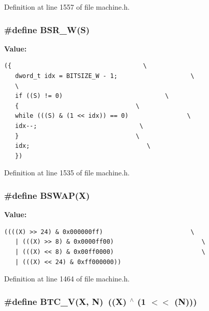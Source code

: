 Definition at line 1557 of file machine.h.
\subsubsection[{BSR\_\-W}]{\setlength{\rightskip}{0pt plus 5cm}\#define BSR\_\-W(S)}\label{machine_8h_e1dda17dbedcc41ade71368a0d2cc665}


\textbf{Value:}

\begin{Code}\begin{verbatim}({                                    \
   dword_t idx = BITSIZE_W - 1;                    \
   \
   if ((S) != 0)                            \
   {                                \
   while (((S) & (1 << idx)) == 0)                \
   idx--;                            \
   }                                \
   idx;                                \
   })
\end{verbatim}
\end{Code}


Definition at line 1535 of file machine.h.
\subsubsection[{BSWAP}]{\setlength{\rightskip}{0pt plus 5cm}\#define BSWAP(X)}\label{machine_8h_a01acd94d7bba7e2ab188b2626e2c66f}


\textbf{Value:}

\begin{Code}\begin{verbatim}((((X) >> 24) & 0x000000ff)                        \
   | (((X) >> 8) & 0x0000ff00)                        \
   | (((X) << 8) & 0x00ff0000)                        \
   | (((X) << 24) & 0xff000000))
\end{verbatim}
\end{Code}


Definition at line 1464 of file machine.h.
\subsubsection[{BTC\_\-V}]{\setlength{\rightskip}{0pt plus 5cm}\#define BTC\_\-V(X, \/  N)~((X) $^\wedge$ (1 $<$$<$ (N)))}\label{machine_8h_48444c19613a792b9f23ea9778c47f14}




